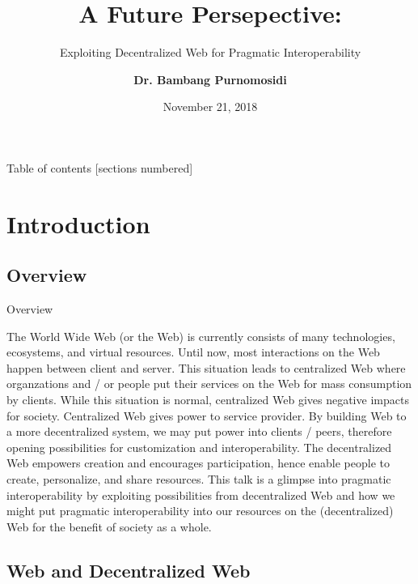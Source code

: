 \documentclass[10pt]{beamer}
\title{A Future Persepective:}
\subtitle{Exploiting Decentralized Web for Pragmatic Interoperability}
\date{November 21, 2018}
\author{\textbf{Dr. Bambang Purnomosidi}}
\institute{Informatics Engineering Department\\STMIK AKAKOM}
\begin{document}
\maketitle

\begin{frame}[allowframebreaks]{Table of contents}
  [sections numbered]
  \tableofcontents
\end{frame}

\section{Introduction}

  \subsection{Overview}

    \begin{frame}[fragile]{Overview}

  The World Wide Web (or the Web) is currently consists of many technologies, ecosystems, and virtual resources. Until now, most interactions on the Web happen between client and server. This situation leads to centralized Web where organzations and / or people put their services on the Web for mass consumption by clients. While this situation is normal, centralized Web gives negative impacts for society. Centralized Web gives power to service provider. By building Web to a more decentralized system, we may put power into clients / peers, therefore opening possibilities for customization and interoperability. The decentralized Web empowers creation and encourages participation, hence enable people to create, personalize, and share resources. This talk is a glimpse into pragmatic interoperability by exploiting possibilities from decentralized Web and how we might put pragmatic interoperability into our resources on the (decentralized) Web for the benefit of society as a whole.

    \end{frame}

  \subsection{Web and Decentralized Web}
\end{document}
